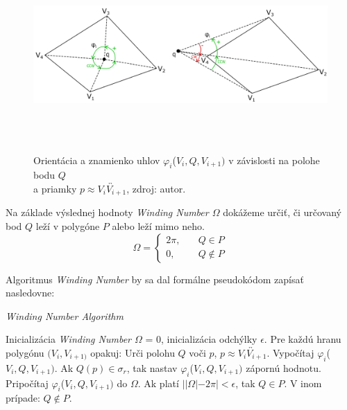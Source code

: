 \documentclass[11pt]{article}
\begin{document}
\begin{figure}[h]
    \captionsetup{justification=centering} 
    \includegraphics[width=16.56cm, height=7.33cm]{obr2.png}
    \centering
    \caption{Orientácia a znamienko uhlov $\varphi_i$($V_i, Q, V_{i+1})$ v závislosti na polohe
    bodu $Q$ \\a priamky $p \approx \overleftrightarrow{V_iV_{i+1}}$, zdroj: autor.}
    \label{fig:obr2}
\end{figure}

\newpage
Na základe výslednej hodnoty \textit{Winding Number $\varOmega$} dokážeme určiť, či určovaný bod $Q$ leží v polygóne $P$ alebo leží mimo neho.
\begin{equation*}
\varOmega=
\begin{cases}
        2\pi,\quad &Q\in P\\
        0, \quad &Q\notin P
\end{cases}
\end{equation*}

\noindent Algoritmus \textit{Winding Number} by sa dal formálne pseudokódom zapísať nasledovne:

\begin{algorithm}
    \caption {\textit{Winding Number Algorithm}}
    \begin{algorithmic}[1]
        \State Inicializácia \textit{Winding Number $\varOmega$} = 0, inicializácia odchýlky $\epsilon$.
        \State Pre každú hranu polygónu $(V_i, V_{i+1)}$ opakuj:
        \State \indent Urči polohu $Q$ voči $p$, $p \approx \overleftrightarrow{V_iV_{i+1}}$.
        \State \indent Vypočítaj $\varphi_i$($V_i, Q, V_{i+1})$.
        \State \indent Ak $Q(p) \in \sigma_r$, tak nastav $\varphi_i$($V_i, Q, V_{i+1})$ zápornú hodnotu.
        \State \indent Pripočítaj $\varphi_i$($V_i, Q, V_{i+1})$ do $\varOmega$.
        \State Ak platí $||\varOmega|-2\pi|<\epsilon$, tak $Q \in P$.
        \State V inom prípade: $Q \notin P$.
    \end{algorithmic}
\end{algorithm}
\end{document}
